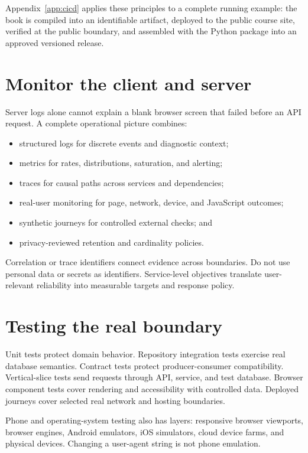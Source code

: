 Appendix~\ref{app:cicd} applies these principles to a complete running example:
the book is compiled into an identifiable artifact, deployed to the public
course site, verified at the public boundary, and assembled with the Python
package into an approved versioned release.

\section{Monitor the client and server}

Server logs alone cannot explain a blank browser screen that failed before an
API request. A complete operational picture combines:

\begin{itemize}
  \item structured logs for discrete events and diagnostic context;
  \item metrics for rates, distributions, saturation, and alerting;
  \item traces for causal paths across services and dependencies;
  \item real-user monitoring for page, network, device, and JavaScript outcomes;
  \item synthetic journeys for controlled external checks; and
  \item privacy-reviewed retention and cardinality policies.
\end{itemize}

Correlation or trace identifiers connect evidence across boundaries. Do not use
personal data or secrets as identifiers. Service-level objectives translate
user-relevant reliability into measurable targets and response policy.

\section{Testing the real boundary}

Unit tests protect domain behavior. Repository integration tests exercise real
database semantics. Contract tests protect producer-consumer compatibility.
Vertical-slice tests send requests through API, service, and test database.
Browser component tests cover rendering and accessibility with controlled data.
Deployed journeys cover selected real network and hosting boundaries.

Phone and operating-system testing also has layers: responsive browser
viewports, browser engines, Android emulators, iOS simulators, cloud device
farms, and physical devices. Changing a user-agent string is not phone
emulation.

